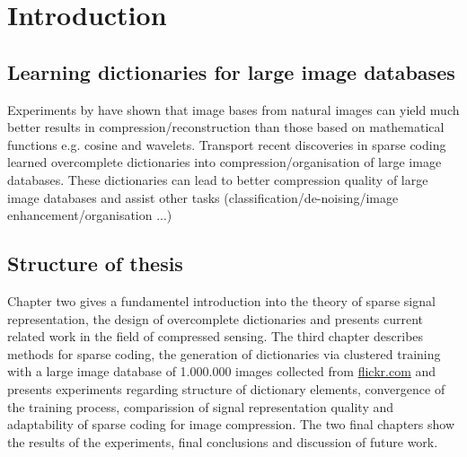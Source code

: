 \chapter{Introduction}
\label{sec:introduction}
\thispagestyle{empty}
\section{Learning dictionaries for large image databases}



Experiments by \cite{} have shown \cite{} that image bases from natural images can yield much better results in compression/reconstruction than
those based on mathematical functions e.g. cosine and wavelets.
\cite{Mairal2010}
Transport recent discoveries in sparse coding learned overcomplete dictionaries into compression/organisation
of large image databases.
These dictionaries can lead to better compression quality of large image databases and assist other tasks (classification/de-noising/image enhancement/organisation ...)


\section{Structure of thesis}
Chapter two gives a fundamentel introduction into the theory of sparse signal representation, 
the design of overcomplete dictionaries and presents current related work in the field of compressed sensing.
The third chapter describes methods for sparse coding, the generation of dictionaries via clustered training with a large image database 
of 1.000.000 images collected from \url{flickr.com} and presents experiments regarding structure of dictionary elements, 
convergence of the training process, comparission of signal representation quality and adaptability of sparse coding for image compression.
The two final chapters show the results of the experiments, final conclusions and discussion of future work. 

